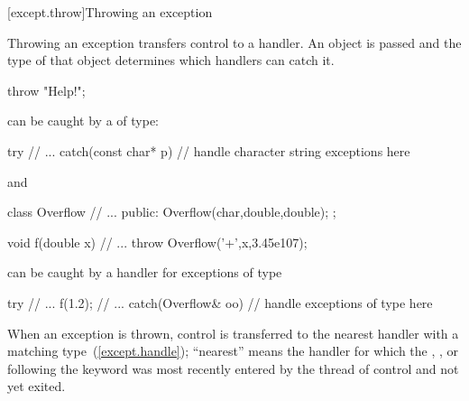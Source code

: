 [except.throw]{Throwing an exception}%
%

\pnum
Throwing an exception transfers control to a handler.
An object is passed and the type of that object determines which handlers
can catch it.
\enterexample
\begin{codeblock}
throw "Help!";
\end{codeblock}
can be caught by a
of
type:
\begin{codeblock}
try {
	// ...
}
catch(const char* p) {
	// handle character string exceptions here
}
\end{codeblock}
and
\begin{codeblock}
class Overflow {
	// ...
public:
    Overflow(char,double,double);
};

void f(double x)
{
	// ...
	throw Overflow('+',x,3.45e107);
}
\end{codeblock}
can be caught by a handler for exceptions of type
\begin{codeblock}
try {
	// ...
	f(1.2);
	// ...
}
catch(Overflow& oo) {
	// handle exceptions of type  here
}
\end{codeblock}
\exitexampleb

\pnum
{}%
%
%
When an exception is thrown, control is transferred to the nearest handler with
a matching type~(\ref{except.handle}); ``nearest'' means the handler
for which the
,
,
or 
following the
keyword was most recently entered by the thread of control and not yet exited.

